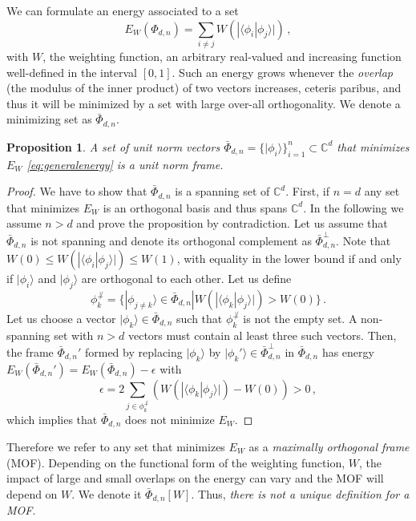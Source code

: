 \documentclass[%
superscriptaddress,
amsmath,amssymb,
 aps,
pra,
floatfix,
]{revtex4-2}
\newtheorem{proposition}{Proposition}[section]
\begin{document}
We can formulate an energy associated to a set
%
\begin{equation}
    E_W(\Phi_{d, n}) = \sum_{i \neq j} W\left(|\langle\phi_i  |\phi_j \rangle|\right) \,,
    \label{eq:generalenergy}
\end{equation}
%
with $W$, the weighting function, an arbitrary real-valued and increasing function well-defined in the interval $[0, 1]$.
%
Such an energy grows whenever the \emph{overlap} (the modulus of the inner product) of two vectors increases, ceteris paribus, and thus it will be minimized by a set with large over-all orthogonality. We denote a minimizing set as $\bar \Phi_{d, n}$.
%
\begin{proposition}\label{prop:MOF}
    A set of unit norm vectors $\bar \Phi_{d, n} = \{ |\phi_i\rangle \}_{i=1}^{n} \subset \mathbb C^d$ that minimizes $E_W$ \eqref{eq:generalenergy} is a unit norm frame.
\end{proposition}
\begin{proof}
    We have to show that $\bar \Phi_{d, n}$ is a spanning set of $\mathbb C^d$. First, if $n=d$ any set that minimizes $E_W$ is an orthogonal basis and thus spans $\mathbb C^d$. In the following we assume $n > d$ and prove the proposition by contradiction. Let us assume that $\bar \Phi_{d, n}$ is not spanning and denote its orthogonal complement as $\bar \Phi_{d, n}^\perp$.
    Note that $W(0) \leq W\left(|\langle\phi_i  |\phi_j \rangle|\right) \leq W(1)$, with equality in the lower bound if and only if $| \phi_i \rangle$ and $| \phi_j \rangle$ are orthogonal to each other. Let us define
    \begin{equation}
        \phi_k^{\not \perp} = \{|\phi_{j \neq k}\rangle \in \bar \Phi_{d, n} | W\left(|\langle\phi_k |\phi_j \rangle|\right) > W(0) \} \,.
    \end{equation}
    Let us choose a vector $|\phi_k\rangle \in \bar \Phi_{d, n}$ such that $\phi_k^{\not \perp}$ is not the empty set. A non-spanning set with $n > d$ vectors must contain al least three such vectors. Then, the frame $\bar \Phi_{d, n}'$ formed by replacing $|\phi_k\rangle$ by $|\phi_k'\rangle \in \bar \Phi_{d, n}^\perp$ in $\bar \Phi_{d, n}$ has energy $E_W(\bar \Phi_{d, n}') = E_W(\bar \Phi_{d, n}) - \epsilon$ with
    \begin{equation}
        \epsilon = 2\sum_{j \in \phi_k^{\not \perp}} \left(  W\left(|\langle\phi_k  |\phi_j \rangle|\right) - W(0) \right) > 0\,,
    \end{equation}
    which implies that $\bar \Phi_{d, n}$ does not minimize $E_W$.
\end{proof}
%
Therefore we refer to any set that minimizes $E_W$ as a \emph{maximally orthogonal frame} (MOF). Depending on the functional form of the weighting function, $W$, the impact of large and small overlaps on the energy can vary and the MOF will depend on $W$. We denote it $\bar \Phi_{d, n}[W]$. Thus, \emph{there is not a unique definition for a MOF}.
\end{document}
